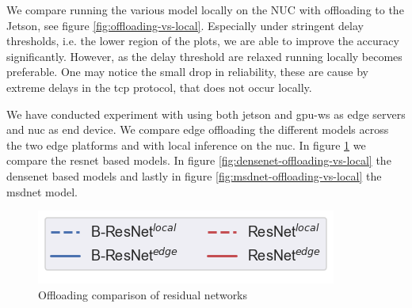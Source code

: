 We compare running the various model locally on the NUC with offloading to the Jetson, see figure \ref{fig:offloading-vs-local}. Especially under stringent delay thresholds, i.e. the lower region of the plots, we are able to improve the accuracy significantly. However, as the delay threshold are relaxed running locally becomes preferable. One may notice the small drop in reliability, these are cause by extreme delays in the \gls{tcp} protocol, that does not occur locally.

We have conducted experiment with using both \gls{jetson} and \gls{gpu-ws} as edge servers and \gls{nuc} as end device. We compare edge offloading the different models across the two edge platforms and with local inference on the \gls{nuc}. In figure \ref{fig:resnet-offloading-vs-local} we compare the \gls{resnet} based models. In figure \ref{fig:densenet-offloading-vs-local} the \gls{densenet} based models and lastly in figure \ref{fig:msdnet-offloading-vs-local} the \gls{msdnet} model.

\begin{figure}
	\captionsetup[subfigure]{justification=centering, farskip=0pt,captionskip=0pt}
	\centering
	\includegraphics[width=.3\linewidth]{figures/edge/gpu_b-resnet_offloading_vs_local_legend}
	\hfill
	\hfill
	\caption[Offloading comparison of residual networks]{Offloading comparison of residual networks}
	\label{fig:resnet-offloading-vs-local}
\end{figure}

